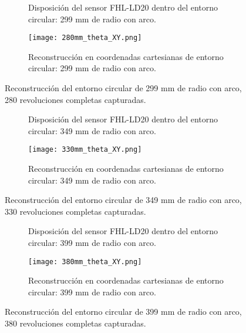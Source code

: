\begin{figure}[H]
	\centering
	\begin{subfigure}{0.45\textwidth}
		\centering
		\caption{Disposición del sensor FHL-LD20 dentro del entorno circular: 299 mm de radio con arco.}
		\label{fig:disposicion_lidar_theta4}
	\end{subfigure}
	\hspace{1em}
	\begin{subfigure}{0.45\textwidth}
		\centering
		\texttt{[image: 280mm\_theta\_XY.png]}
		\caption{Reconstrucción en coordenadas cartesianas de entorno circular: 299 mm de radio con arco.}
		\label{fig:299m_radius_xy_theta4}
	\end{subfigure}
	\caption{Reconstrucción del entorno circular de 299 mm de radio con arco, 280 revoluciones completas capturadas.}
	\label{fig:disposicion_lidar_var_theta4}
\end{figure}


\begin{figure}[H]
	\centering
	\begin{subfigure}{0.45\textwidth}
		\centering
		\caption{Disposición del sensor FHL-LD20 dentro del entorno circular: 349 mm de radio con arco.}
		\label{fig:disposicion_lidar_theta5}
	\end{subfigure}
	\hspace{1em}
	\begin{subfigure}{0.45\textwidth}
		\centering
		\texttt{[image: 330mm\_theta\_XY.png]}
		\caption{Reconstrucción en coordenadas cartesianas de entorno circular: 349 mm de radio con arco.}
		\label{fig:349m_radius_xy_theta5}
	\end{subfigure}
	\caption{Reconstrucción del entorno circular de 349 mm de radio con arco, 330 revoluciones completas capturadas.}
	\label{fig:disposicion_lidar_var_theta5}
\end{figure}


\begin{figure}[H]
	\centering
	\begin{subfigure}{0.45\textwidth}
		\centering
		\caption{Disposición del sensor FHL-LD20 dentro del entorno circular: 399 mm de radio con arco.}
		\label{fig:disposicion_lidar_theta6}
	\end{subfigure}
	\hspace{1em}
	\begin{subfigure}{0.45\textwidth}
		\centering
		\texttt{[image: 380mm\_theta\_XY.png]}
		\caption{Reconstrucción en coordenadas cartesianas de entorno circular: 399 mm de radio con arco.}
		\label{fig:399m_radius_xy_theta6}
	\end{subfigure}
	\caption{Reconstrucción del entorno circular de 399 mm de radio con arco, 380 revoluciones completas capturadas.}
	\label{fig:disposicion_lidar_var_theta6}
\end{figure}


